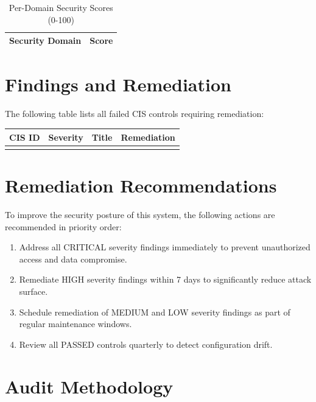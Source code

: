\documentclass[12pt,a4paper]{article}
\begin{document}
\begin{table}[h]
\centering
\begin{tabular}{lr}
\toprule
\textbf{Security Domain} & \textbf{Score} \\
\midrule
\bottomrule
\end{tabular}
\caption{Per-Domain Security Scores (0-100)}
\end{table}

\newpage

\section*{Findings and Remediation}

The following table lists all failed CIS controls requiring remediation:

\begin{longtable}{|p{1.2cm}|p{1.2cm}|p{4cm}|p{6cm}|}
\hline
\textbf{CIS ID} & \textbf{Severity} & \textbf{Title} & \textbf{Remediation} \\
\hline
\endhead
\hline
\endfoot


\end{longtable}

\newpage

\section*{Remediation Recommendations}

To improve the security posture of this system, the following actions are recommended in priority order:

\begin{enumerate}
\item Address all CRITICAL severity findings immediately to prevent unauthorized access and data compromise.
\item Remediate HIGH severity findings within 7 days to significantly reduce attack surface.
\item Schedule remediation of MEDIUM and LOW severity findings as part of regular maintenance windows.
\item Review all PASSED controls quarterly to detect configuration drift.
\end{enumerate}

\newpage

\section*{Audit Methodology}
\end{document}
